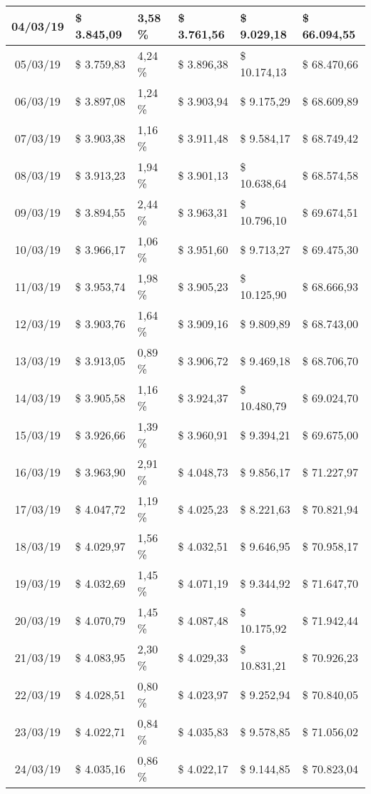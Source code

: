 \begin{small}
\begin{longtable}{|c|l|l|l|l|l|}
04/03/19 & \$ 3.845,09 & 3,58 \% & \$ 3.761,56 & \$ 9.029,18 & \$ 66.094,55 \\ \hline
05/03/19 & \$ 3.759,83 & 4,24 \% & \$ 3.896,38 & \$ 10.174,13 & \$ 68.470,66 \\ \hline
06/03/19 & \$ 3.897,08 & 1,24 \% & \$ 3.903,94 & \$ 9.175,29 & \$ 68.609,89 \\ \hline
07/03/19 & \$ 3.903,38 & 1,16 \% & \$ 3.911,48 & \$ 9.584,17 & \$ 68.749,42 \\ \hline
08/03/19 & \$ 3.913,23 & 1,94 \% & \$ 3.901,13 & \$ 10.638,64 & \$ 68.574,58 \\ \hline
09/03/19 & \$ 3.894,55 & 2,44 \% & \$ 3.963,31 & \$ 10.796,10 & \$ 69.674,51 \\ \hline
10/03/19 & \$ 3.966,17 & 1,06 \% & \$ 3.951,60 & \$ 9.713,27 & \$ 69.475,30 \\ \hline
11/03/19 & \$ 3.953,74 & 1,98 \% & \$ 3.905,23 & \$ 10.125,90 & \$ 68.666,93 \\ \hline
12/03/19 & \$ 3.903,76 & 1,64 \% & \$ 3.909,16 & \$ 9.809,89 & \$ 68.743,00 \\ \hline
13/03/19 & \$ 3.913,05 & 0,89 \% & \$ 3.906,72 & \$ 9.469,18 & \$ 68.706,70 \\ \hline
14/03/19 & \$ 3.905,58 & 1,16 \% & \$ 3.924,37 & \$ 10.480,79 & \$ 69.024,70 \\ \hline
15/03/19 & \$ 3.926,66 & 1,39 \% & \$ 3.960,91 & \$ 9.394,21 & \$ 69.675,00 \\ \hline
16/03/19 & \$ 3.963,90 & 2,91 \% & \$ 4.048,73 & \$ 9.856,17 & \$ 71.227,97 \\ \hline
17/03/19 & \$ 4.047,72 & 1,19 \% & \$ 4.025,23 & \$ 8.221,63 & \$ 70.821,94 \\ \hline
18/03/19 & \$ 4.029,97 & 1,56 \% & \$ 4.032,51 & \$ 9.646,95 & \$ 70.958,17 \\ \hline
19/03/19 & \$ 4.032,69 & 1,45 \% & \$ 4.071,19 & \$ 9.344,92 & \$ 71.647,70 \\ \hline
20/03/19 & \$ 4.070,79 & 1,45 \% & \$ 4.087,48 & \$ 10.175,92 & \$ 71.942,44 \\ \hline
21/03/19 & \$ 4.083,95 & 2,30 \% & \$ 4.029,33 & \$ 10.831,21 & \$ 70.926,23 \\ \hline
22/03/19 & \$ 4.028,51 & 0,80 \% & \$ 4.023,97 & \$ 9.252,94 & \$ 70.840,05 \\ \hline
23/03/19 & \$ 4.022,71 & 0,84 \% & \$ 4.035,83 & \$ 9.578,85 & \$ 71.056,02 \\ \hline
24/03/19 & \$ 4.035,16 & 0,86 \% & \$ 4.022,17 & \$ 9.144,85 & \$ 70.823,04 \\ \hline

\end{longtable}
\end{small}
